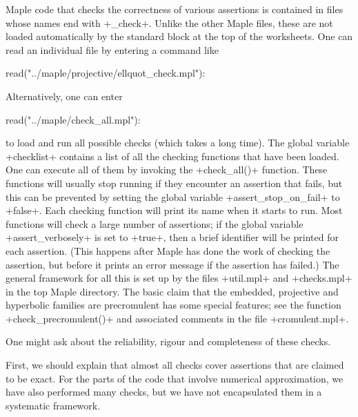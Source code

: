 \documentclass[reqno]{amsart}
\renewcommand{\:}{\colon}
\theoremstyle{definition}
\begin{document}
Maple code that checks the correctness of various assertions is
contained in files whose names end with \fname+_check+.  Unlike the
other Maple files, these are not loaded automatically by the standard
block at the top of the worksheets.  One can read an individual file
by entering a command like
\begin{mcodeblock}
   read("../maple/projective/ellquot_check.mpl"):
\end{mcodeblock}
Alternatively, one can enter
\begin{mcodeblock}
   read("../maple/check_all.mpl"):
\end{mcodeblock}
to load and run all possible checks (which takes a long time).  The
global variable \mcode+checklist+ contains a list of all the checking
functions that have been loaded.  One can execute all of them by
invoking the \mcode+check_all()+ function.  These functions will
usually stop running if they encounter an assertion that fails, but
this can be prevented by setting the global variable
\mcode+assert_stop_on_fail+ to \mcode+false+.  Each checking function
will print its name when it starts to run.  Most functions will check
a large number of assertions; if the global variable
\mcode+assert_verbosely+ is set to \mcode+true+, then a brief identifier
will be printed for each assertion.  (This happens after Maple has
done the work of checking the assertion, but before it prints an error
message if the assertion has failed.) The general framework for all
this is set up by the files \fname+util.mpl+ and \fname+checks.mpl+ in
the top Maple directory.  The basic claim that the embedded,
projective and hyperbolic families are precromulent has some special
features; see the function \mcode+check_precromulent()+ and associated
comments in the file \fname+cromulent.mpl+.

One might ask about the reliability, rigour and completeness of these
checks.

First, we should explain that almost all checks cover assertions that
are claimed to be exact.  For the parts of the code that involve
numerical approximation, we have also performed many checks, but we
have not encapsulated them in a systematic framework.
\end{document}
